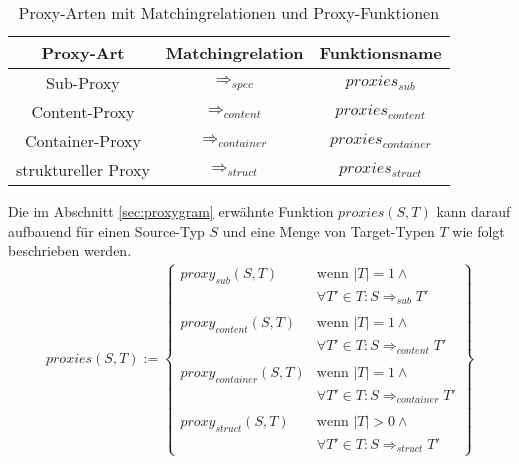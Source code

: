 \begin{table}[H]
\centering
\begin{tabular}{|c|c|c|}
\hline
\hline
\centering\textbf{Proxy-Art} & \textbf{Matchingrelation} & \textbf{Funktionsname}\\
\hline
\hline
Sub-Proxy
&  
$\Rightarrow_{spec}$
& 
$\mathit{proxies_{sub}}$
\\
\hline
Content-Proxy
& 
$\Rightarrow_{content}$
& 
$\mathit{proxies_{content}}$
\\
\hline
Container-Proxy
& 
$\Rightarrow_{container}$
& 
$\mathit{proxies_{container}}$
\\
\hline
struktureller Proxy
&
$\Rightarrow_{struct}$
& 
$\mathit{proxies_{struct}}$
 \\
\hline
\hline
\end{tabular}
\caption{Proxy-Arten mit Matchingrelationen und Proxy-Funktionen}
 \label{tab:baseMatcher}
\end{table}
\noindent
Die im Abschnitt \ref{sec:proxygram} erwähnte Funktion $\mathit{proxies(S,T)}$ kann darauf aufbauend für einen Source-Typ $S$ und eine Menge von Target-Typen $T$ wie folgt beschrieben werden.
\begin{gather*}
\mathit{proxies(S,T)} := 
\left\{\begin{array}{ll}
\mathit{proxy_{sub}(S,T)}	& \text{wenn } |T| = 1 \wedge \mathit{ }\\
& \forall T' \in T: S \Rightarrow_{sub} T'\\	
&\\
\mathit{proxy_{content}(S,T)}	& \text{wenn } |T| = 1 \wedge \mathit{ }\\
& \forall T' \in T: S \Rightarrow_{content} T' \\
&\\
\mathit{proxy_{container}(S,T)} & \text{wenn } |T| = 1 \wedge \mathit{ } \\
& \forall T' \in T: S \Rightarrow_{container} T' \\
&\\
\mathit{proxy_{struct}(S,T)} & \text{wenn } |T| > 0 \wedge \mathit{ } \\
&\forall T' \in T: S \Rightarrow_{struct} T'
		 \end{array}
\right\}
\end{gather*}
